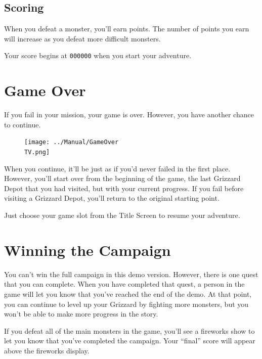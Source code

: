 \documentclass[10pt,twocolumn,openany,article]{memoir}
\newcommand\TV{NTSC}
\newcommand\TV{PAL}
\newcommand\TV{SECAM}
\begin{document}
\begin{description}
\subsection{Scoring}

When you  defeat a monster, you'll  earn points. The number  of points
you earn will increase as you defeat more difficult monsters.

Your score begins at \texttt{000000} when you start your adventure.

\section{Game Over}

If  you fail  in your  mission,  your game  is over.  However, you  have
another chance to continue.

\begin{figure}[b]
  \begin{center}
    \texttt{[image: ../Manual/GameOver\\TV.png]}
  \end{center}
\end{figure}

When you continue, it'll  be just as if you'd never  failed in the first
place. However,  you'll start over from  \ifdefined\NOSAVE the beginning
of the game, \else the last Grizzard Depot that you had visited, \fi but
with your  current progress.  \ifdefined\NOSAVE\else If you  fail before
visiting a Grizzard Depot, you'll return to the original starting point.
\fi

Just  choose   your  game   slot  from  the   Title  Screen   to  resume
your adventure.

\section{Winning the Campaign}\label{Winning the Campaign}

\ifdefined\DEMO

You can't win the full campaign  in this demo version. However, there is
one quest  that you can  complete. When  you have completed  that quest,
a person in  the game will let  you know that you've reached  the end of
the demo. At that  point, you can continue to level  up your Grizzard by
fighting more monsters,  but you won't be able to  make more progress in
the story.

\else

If  you  defeat  all of  the  main  monsters  in  the game,  you'll  see
a fireworks  show to let  you know  that you've completed  the campaign.
Your ``final'' score will appear above the fireworks display.


\end{description}
\end{document}
